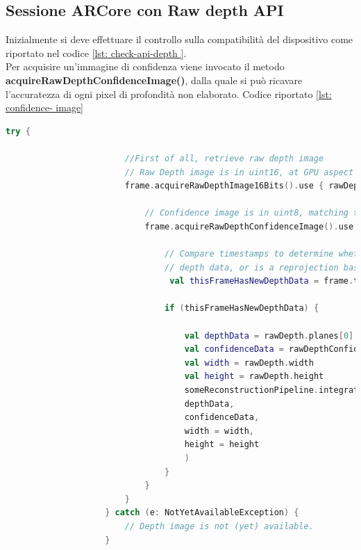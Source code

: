 \documentclass[crop=false, class=book]{standalone}
\begin{document}
		\subsection{Sessione ARCore con Raw depth API}
		
		Inizialmente si deve effettuare il controllo sulla compatibilità del dispositivo come riportato nel codice \vref{lst: check-api-depth }.\\
		Per acquisire un'immagine di confidenza viene invocato il metodo \textbf{acquireRawDepthConfidenceImage()}, dalla 				quale si può ricavare l'accuratezza di ogni pixel di profondità non elaborato. Codice riportato \vref{lst: confidence-			image}
		
		\begin{center}
				\begin{minipage}{0.95\textwidth}
					\begin{lstlisting}[caption={Estrazione di un'immagine di confidenza}, label={lst: confidence-image}, language=Kotlin]
					 try {
					 
					 	//First of all, retrieve raw depth image
  						// Raw Depth image is in uint16, at GPU aspect ratio, in native orientation.
  						frame.acquireRawDepthImage16Bits().use { rawDepth ->
  						
    						// Confidence image is in uint8, matching the depth image size.
    						frame.acquireRawDepthConfidenceImage().use { rawDepthConfidence ->
    						
      							// Compare timestamps to determine whether depth is is based on new
      							// depth data, or is a reprojection based on device movement.
     							 val thisFrameHasNewDepthData = frame.timestamp == rawDepth.timestamp
     							 
      							if (thisFrameHasNewDepthData) {
      							
        							val depthData = rawDepth.planes[0].buffer
        							val confidenceData = rawDepthConfidence.planes[0].buffer
        							val width = rawDepth.width
        							val height = rawDepth.height
        							someReconstructionPipeline.integrateNewImage(
          							depthData,
          							confidenceData,
         						 	width = width,
          							height = height
        							)
      							}
    						}
  						}
					} catch (e: NotYetAvailableException) {
  						// Depth image is not (yet) available.
					}
					
				\end{lstlisting}
			\end{minipage}
		\end{center}
		
\end{document}
